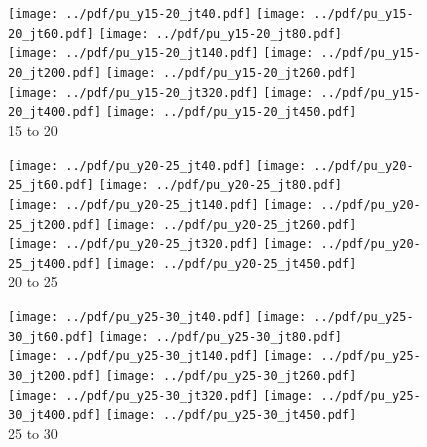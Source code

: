 \documentclass[landscape,10pt]{beamer} %
\begin{document}
\newpage

\begin{figure}[p]
\texttt{[image: ../pdf/pu\_y15-20\_jt40.pdf]}
\texttt{[image: ../pdf/pu\_y15-20\_jt60.pdf]}
\texttt{[image: ../pdf/pu\_y15-20\_jt80.pdf]}\\
\texttt{[image: ../pdf/pu\_y15-20\_jt140.pdf]}
\texttt{[image: ../pdf/pu\_y15-20\_jt200.pdf]}
\texttt{[image: ../pdf/pu\_y15-20\_jt260.pdf]}\\
\texttt{[image: ../pdf/pu\_y15-20\_jt320.pdf]}
\texttt{[image: ../pdf/pu\_y15-20\_jt400.pdf]}
\texttt{[image: ../pdf/pu\_y15-20\_jt450.pdf]}
\\
15 to 20
\end{figure}

\newpage

\begin{figure}[p]
\texttt{[image: ../pdf/pu\_y20-25\_jt40.pdf]}
\texttt{[image: ../pdf/pu\_y20-25\_jt60.pdf]}
\texttt{[image: ../pdf/pu\_y20-25\_jt80.pdf]}\\
\texttt{[image: ../pdf/pu\_y20-25\_jt140.pdf]}
\texttt{[image: ../pdf/pu\_y20-25\_jt200.pdf]}
\texttt{[image: ../pdf/pu\_y20-25\_jt260.pdf]}\\
\texttt{[image: ../pdf/pu\_y20-25\_jt320.pdf]}
\texttt{[image: ../pdf/pu\_y20-25\_jt400.pdf]}
\texttt{[image: ../pdf/pu\_y20-25\_jt450.pdf]}
\\
20 to 25
\end{figure}

\newpage

\begin{figure}[p]
\texttt{[image: ../pdf/pu\_y25-30\_jt40.pdf]}
\texttt{[image: ../pdf/pu\_y25-30\_jt60.pdf]}
\texttt{[image: ../pdf/pu\_y25-30\_jt80.pdf]}\\
\texttt{[image: ../pdf/pu\_y25-30\_jt140.pdf]}
\texttt{[image: ../pdf/pu\_y25-30\_jt200.pdf]}
\texttt{[image: ../pdf/pu\_y25-30\_jt260.pdf]}\\
\texttt{[image: ../pdf/pu\_y25-30\_jt320.pdf]}
\texttt{[image: ../pdf/pu\_y25-30\_jt400.pdf]}
\texttt{[image: ../pdf/pu\_y25-30\_jt450.pdf]}
\\
25 to 30
\end{figure}
\end{document}
